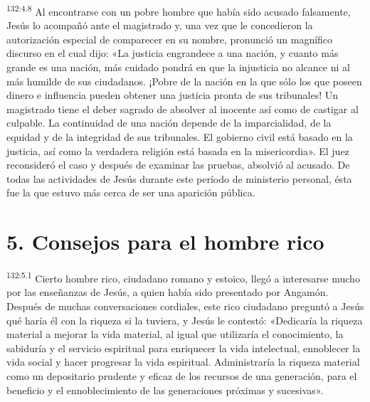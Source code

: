 \par 
\textsuperscript{132:4.8} Al encontrarse con un pobre hombre que había sido acusado falsamente, Jesús lo acompañó ante el magistrado y, una vez que le concedieron la autorización especial de comparecer en su nombre, pronunció un magnífico discurso en el cual dijo: «La justicia engrandece a una nación, y cuanto más grande es una nación, más cuidado pondrá en que la injusticia no alcance ni al más humilde de sus ciudadanos. ¡Pobre de la nación en la que sólo los que poseen dinero e influencia pueden obtener una justicia pronta de sus tribunales! Un magistrado tiene el deber sagrado de absolver al inocente así como de castigar al culpable. La continuidad de una nación depende de la imparcialidad, de la equidad y de la integridad de sus tribunales. El gobierno civil está basado en la justicia, así como la verdadera religión está basada en la misericordia». El juez reconsideró el caso y después de examinar las pruebas, absolvió al acusado. De todas las actividades de Jesús durante este período de ministerio personal, ésta fue la que estuvo más cerca de ser una aparición pública.

\section*{5. Consejos para el hombre rico}
\par 
\textsuperscript{132:5.1} Cierto hombre rico, ciudadano romano y estoico, llegó a interesarse mucho por las enseñanzas de Jesús, a quien había sido presentado por Angamón. Después de muchas conversaciones cordiales, este rico ciudadano preguntó a Jesús qué haría él con la riqueza si la tuviera, y Jesús le contestó: «Dedicaría la riqueza material a mejorar la vida material, al igual que utilizaría el conocimiento, la sabiduría y el servicio espiritual para enriquecer la vida intelectual, ennoblecer la vida social y hacer progresar la vida espiritual. Administraría la riqueza material como un depositario prudente y eficaz de los recursos de una generación, para el beneficio y el ennoblecimiento de las generaciones próximas y sucesivas».


